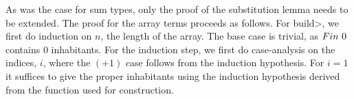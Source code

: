  As was the case for sum types, only the proof of the substitution lemma needs to be extended.
  The proof for the array terms proceeds as follows.
  For \<build>, we first do induction on $n$, the length of the array.
  The base case is trivial, as $Fin\ 0$ contains $0$ inhabitants.
  For the induction step, we first do case-analysis on the indices, $i$, where the $(+1)$ case follows from the induction hypothesis.
  For $i=1$ it suffices to give the proper inhabitants using the induction hypothesis derived from the function used for construction.
